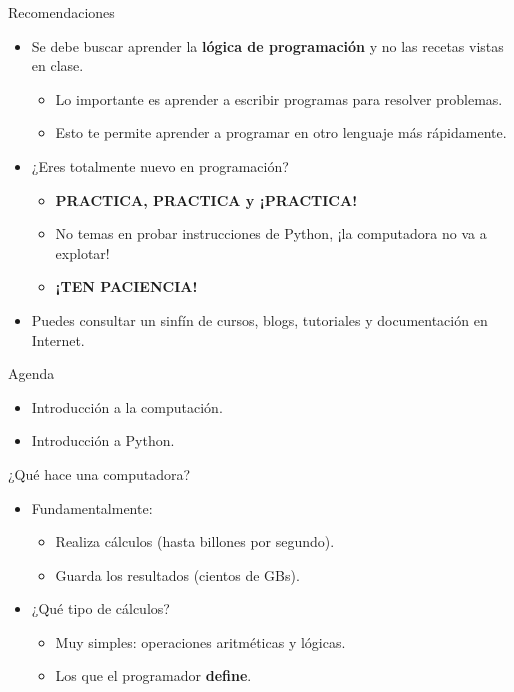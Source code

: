 \documentclass[mathserif]{beamer}
\begin{document}
\begin{frame}{Recomendaciones}
    \begin{itemize}
        \item Se debe buscar aprender la {\bfseries\blue lógica de programación} y no las recetas vistas en clase.
        \begin{itemize}
            \item Lo importante es aprender a escribir programas para resolver problemas. 
            \item Esto te permite aprender a programar en otro lenguaje más rápidamente.
        \end{itemize}
        
        \item ¿Eres totalmente nuevo en programación? 
            \begin{itemize}
                \item {\bfseries\orange PRACTICA, PRACTICA y ¡PRACTICA!}
                
                \item No temas en probar instrucciones de Python, ¡la computadora no va a explotar!
                
                \item {\bfseries\blue ¡TEN PACIENCIA!}
            \end{itemize}
            
        \item Puedes consultar un sinfín de cursos, blogs, tutoriales y documentación en Internet.
    \end{itemize}
\end{frame}

\begin{frame}{Agenda}
    \begin{itemize}
        \item Introducción a la computación.
        \item Introducción a Python.
    \end{itemize}
\end{frame}

\begin{frame}{¿Qué hace una computadora?}
    \begin{itemize}
        \item Fundamentalmente: 
            \begin{itemize}
                \item Realiza cálculos (hasta billones por segundo).
                \item Guarda los resultados (cientos de GBs).
            \end{itemize}
        \item ¿Qué tipo de cálculos?
            \begin{itemize}
                \item Muy simples: operaciones aritméticas y lógicas.
                \item Los que el programador {\bfseries\blue define}.
            \end{itemize}
    \end{itemize}
\end{frame}
\end{document}
